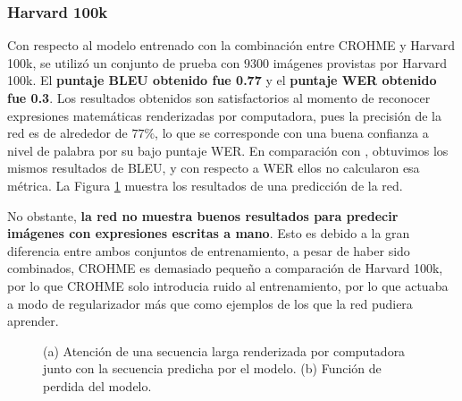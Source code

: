 \subsubsection{Harvard 100k}

Con respecto al modelo entrenado con la combinación entre CROHME y Harvard 100k, se utilizó un conjunto de prueba con $9300$ imágenes provistas por Harvard 100k. El \textbf{puntaje BLEU obtenido fue 0.77} y el \textbf{puntaje WER obtenido fue 0.3}. Los resultados obtenidos son satisfactorios al momento de reconocer expresiones matemáticas renderizadas por computadora, pues la precisión de la red es de alrededor de $77\%$, lo que se corresponde con una buena confianza a nivel de palabra por su bajo puntaje WER. En comparación con \cite{harvard}, obtuvimos los mismos resultados de BLEU, y con respecto a WER ellos no calcularon esa métrica. La Figura \ref{fig:modelo-harvard-attention}  muestra los resultados de una predicción de la red. 

No obstante, \textbf{la red no muestra buenos resultados para predecir imágenes con expresiones escritas a mano}. Esto es debido a la gran diferencia entre ambos conjuntos de entrenamiento, a pesar de haber sido combinados, CROHME es demasiado pequeño a comparación de Harvard 100k, por lo que CROHME solo introducia ruido al entrenamiento, por lo que actuaba a modo de regularizador más que como ejemplos de los que la red pudiera aprender. 

\begin{figure}[H]
    \centering
    \caption{(a) Atención de una secuencia larga renderizada por computadora junto con la secuencia predicha por el modelo. (b) Función de perdida del modelo.}
    \label{fig:modelo-harvard-attention}
\end{figure}



